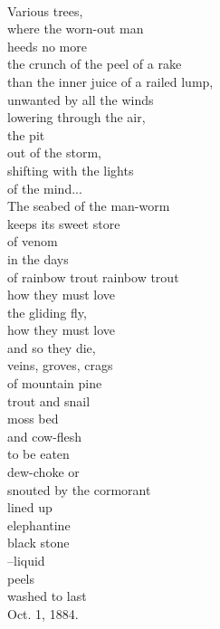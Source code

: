 \documentclass[smalldemyvopaper,11pt,twoside,onecolumn,openright,extrafontsizes]{memoir}
\begin{document}
\\Various trees,
\\where the worn-out man
\\heeds no more
\\the crunch of the peel of a rake
\\than the inner juice of a railed lump,
\\unwanted by all the winds
\\lowering through the air,
\\the pit
\\out of the storm,
\\shifting with the lights
\\of the mind...
\\The seabed of the man-worm
\\keeps its sweet store
\\of venom
\\in the days
\\of rainbow trout rainbow trout
\\how they must love
\\the gliding fly,
\\how they must love
\\and so they die,
\\veins, groves, crags
\\of mountain pine
\\trout and snail
\\moss bed
\\and cow-flesh
\\to be eaten
\\dew-choke or
\\snouted by the cormorant
\\lined up
\\elephantine
\\black stone
\\--liquid
\\peels
\\washed to last
\\Oct. 1, 1884.
\end{document}
